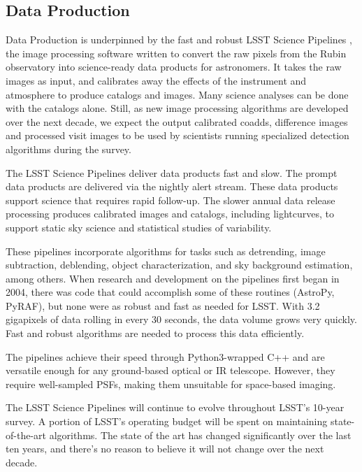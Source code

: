 \subsection{Data Production} \label{sec:dataproduction}

Data Production is underpinned by the fast and robust LSST Science Pipelines \citet{PSTN-019}, the image processing software written to convert the raw pixels from the Rubin observatory into science-ready data products for astronomers. It takes the raw images as input, and calibrates away the effects of the instrument and atmosphere to produce catalogs and images. Many science analyses can be done with the catalogs alone. Still, as new image processing algorithms are developed over the next decade, we expect the output calibrated coadds, difference images and processed visit images to be used by scientists running specialized detection algorithms during the survey.

The LSST Science Pipelines deliver data products fast and slow. The prompt data products are delivered via the nightly alert stream. These data products support science that requires rapid follow-up. The slower annual data release processing produces calibrated images and catalogs, including lightcurves, to support static sky science and statistical studies of variability.

These pipelines incorporate algorithms for tasks such as detrending, image subtraction, deblending, object characterization, and sky background estimation, among others. When research and development on the pipelines first began in 2004, there was code that could accomplish some of these routines (AstroPy, PyRAF), but none were as robust and fast as needed for LSST. With 3.2 gigapixels of data rolling in every 30 seconds, the data volume grows very quickly. Fast and robust algorithms are needed to process this data efficiently.

The pipelines achieve their speed through Python3-wrapped C++ and are versatile enough for any ground-based optical or IR telescope. However, they require well-sampled PSFs, making them unsuitable for space-based imaging.

The LSST Science Pipelines will continue to evolve throughout LSST's 10-year survey. A portion of LSST's operating budget will be spent on maintaining state-of-the-art algorithms. The state of the art has changed significantly over the last ten years, and there's no reason to believe it will not change over the next decade.

